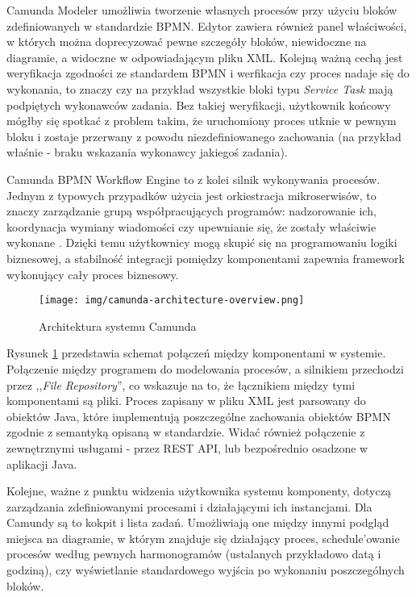 \documentclass[declaration,shortabstract,mgr]{iithesis}
\newcommand{\bpmn}{BPMN }
\newcommand{\bpmnnospace}{BPMN}
\begin{document}
Camunda Modeler umożliwia tworzenie własnych procesów przy użyciu bloków zdefiniowanych w standardzie \bpmnnospace. Edytor zawiera również panel właściwości, w których można doprecyzować pewne szczegóły bloków, niewidoczne na diagramie, a widoczne w odpowiadającym pliku XML. Kolejną ważną cechą jest weryfikacja zgodności ze standardem \bpmn i werfikacja czy proces nadaje się do wykonania, to znaczy czy na przykład wszystkie bloki typu \textit{Service Task} mają podpiętych wykonawców zadania. Bez takiej weryfikacji, użytkownik końcowy mógłby się spotkać z problem takim, że uruchomiony proces utknie w pewnym bloku i zostaje przerwany z powodu niezdefiniowanego zachowania (na przykład właśnie - braku wskazania wykonawcy jakiegoś zadania).

Camunda BPMN Workflow Engine to z kolei silnik wykonywania procesów. Jednym z typowych przypadków użycia jest orkiestracja mikroserwisów, to znaczy zarządzanie grupą współpracujących programów: nadzorowanie ich, koordynacja wymiany wiadomości czy upewnianie się, że zostały właściwie wykonane \cite{camunda-orchestration}. Dzięki temu użytkownicy mogą skupić się na programowaniu logiki biznesowej, a stabilność integracji pomiędzy komponentami zapewnia framework wykonujący cały proces biznesowy.

\begin{figure}
    \texttt{[image: img/camunda-architecture-overview.png]}
    \caption{Architektura systemu Camunda \cite{camunda-docs-introduction}}
    \label{fig:camunda-overview}
\end{figure}

Rysunek \ref{fig:camunda-overview} przedstawia schemat połączeń między komponentami w systemie. Połączenie między programem do modelowania procesów, a silnikiem przechodzi przez ,,\textit{File Repository}'', co wskazuje na to, że łącznikiem między tymi komponentami są pliki. Proces zapisany w pliku XML jest parsowany do obiektów Java, które implementują poszczególne zachowania obiektów \bpmn zgodnie z semantyką opisaną w standardzie. Widać również połączenie z zewnętrznymi usługami - przez REST API, lub bezpośrednio osadzone w aplikacji Java.

Kolejne, ważne z punktu widzenia użytkownika systemu komponenty, dotyczą zarządzania zdefiniowanymi procesami i działającymi ich instancjami. Dla Camundy są to kokpit i lista zadań. Umożliwiają one między innymi podgląd miejsca na diagramie, w którym znajduje się działający proces, schedule'owanie procesów według pewnych harmonogramów (ustalanych przykładowo datą i godziną), czy wyświetlanie standardowego wyjścia po wykonaniu poszczególnych bloków.
\end{document}
